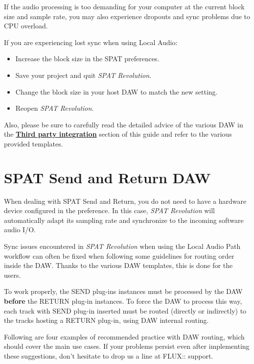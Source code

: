 \documentclass[
  letterpaper,
  DIV=11,
  numbers=noendperiod]{scrreport}
\providecommand{\tightlist}{%
  \setlength{\itemsep}{0pt}\setlength{\parskip}{0pt}}\usepackage{longtable,booktabs,array}
\begin{document}
If the audio processing is too demanding for your computer at the
current block size and sample rate, you may also experience dropouts and
sync problems due to CPU overload.

If you are experiencing lost sync when using Local Audio:

\begin{itemize}
\tightlist
\item
  Increase the block size in the SPAT preferences.
\item
  Save your project and quit \emph{SPAT Revolution}.
\item
  Change the block size in your host DAW to match the new setting.
\item
  Reopen \emph{SPAT Revolution}.
\end{itemize}

Also, please be sure to carefully read the detailed advice of the
various DAW in the \textbf{\href{Third_Party_Integration.md}{Third party
integration}} section of this guide and refer to the various provided
templates.

\hypertarget{spat-send-and-return-daw}{%
\section{SPAT Send and Return DAW}\label{spat-send-and-return-daw}}

When dealing with SPAT Send and Return, you do not need to have a
hardware device configured in the preference. In this case, \emph{SPAT
Revolution} will automatically adapt its sampling rate and synchronize
to the incoming software audio I/O.

Sync issues encountered in \emph{SPAT Revolution} when using the Local
Audio Path workflow can often be fixed when following some guidelines
for routing order inside the DAW. Thanks to the various DAW templates,
this is done for the users.

To work properly, the SEND plug-ins instances must be processed by the
DAW \textbf{before} the RETURN plug-in instances. To force the DAW to
process this way, each track with SEND plug-in inserted must be routed
(directly or indirectly) to the tracks hosting a RETURN plug-in, using
DAW internal routing.

Following are four examples of recommended practice with DAW routing,
which should cover the main use cases. If your problems persist even
after implementing these suggestions, don't hesitate to drop us a line
at FLUX:: support.
\end{document}
